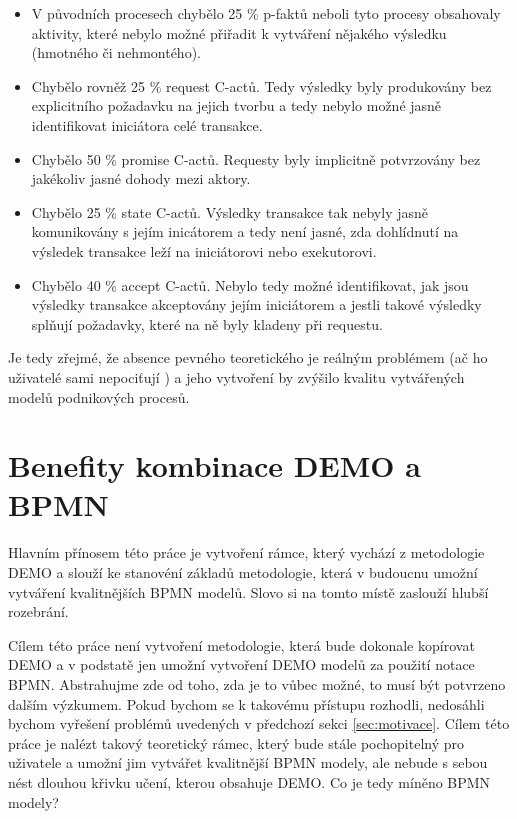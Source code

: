 \documentclass[]{article}
\begin{document}
\begin{itemize}
\item V původních procesech chybělo 25 \% p-faktů neboli tyto procesy obsahovaly aktivity, které nebylo možné přiřadit k vytváření nějakého výsledku (hmotného či nehmontého).
\item Chybělo rovněž 25 \% request C-actů. Tedy výsledky byly produkovány bez explicitního požadavku na jejich tvorbu a tedy nebylo možné jasně identifikovat iniciátora celé transakce.
\item Chybělo 50 \% promise C-actů. Requesty byly implicitně potvrzovány bez jakékoliv jasné dohody mezi aktory.
\item Chybělo 25 \% state C-actů. Výsledky transakce tak nebyly jasně komunikovány s jejím inicátorem a tedy není jasné, zda dohlídnutí na výsledek transakce leží na iniciátorovi nebo exekutorovi.
\item Chybělo 40 \% accept C-actů. Nebylo tedy možné identifikovat, jak jsou výsledky transakce akceptovány jejím iniciátorem a jestli takové výsledky splňují požadavky, které na ně byly kladeny při requestu.
\end{itemize}

Je tedy zřejmé, že absence pevného teoretického je reálným problémem (ač ho uživatelé sami nepociťují \cite{VanNuffel2009}) a jeho vytvoření by zvýšilo kvalitu vytvářených modelů podnikových procesů.

\section{Benefity kombinace DEMO a BPMN}
Hlavním přínosem této práce je vytvoření rámce, který vychází z metodologie DEMO a slouží ke stanovéní základů metodologie, která v budoucnu umožní vytváření kvalitnějších BPMN modelů. Slovo  si na tomto místě zaslouží hlubší rozebrání.

Cílem této práce není vytvoření metodologie, která bude dokonale kopírovat DEMO a v podstatě jen umožní vytvoření DEMO modelů za použití notace BPMN. Abstrahujme zde od toho, zda je to vůbec možné, to musí být potvrzeno dalším výzkumem. Pokud bychom se k takovému přístupu rozhodli, nedosáhli bychom vyřešení problémů uvedených v předchozí sekci \ref{sec:motivace}. Cílem této práce je nalézt takový teoretický rámec, který bude stále pochopitelný pro uživatele a umožní jim vytvářet kvalitnější BPMN modely, ale nebude s sebou nést dlouhou křivku učení, kterou obsahuje DEMO. Co je tedy míněno  BPMN modely?
\end{document}
